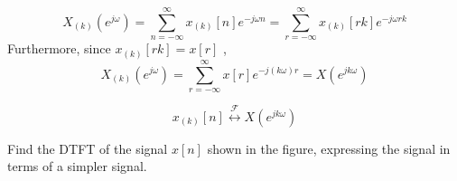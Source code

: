 \begin{frame}
        \begin{figure}
            \centering
            
        \end{figure}
\end{frame}

\begin{frame}
    \begin{equation*}
        X_{(k)}(e^{j\omega}) = \sum_{n=-\infty}^{\infty}x_{(k)}[n]e^{-j\omega n} = \sum_{r=-\infty}^{\infty}x_{(k)}[rk]e^{-j\omega rk}
    \end{equation*}
    Furthermore, since $x_{(k)}[rk] = x[r]$ ,
    \begin{equation*}
        X_{(k)}(e^{j\omega}) = \sum_{r=-\infty}^{\infty}x[r]e^{-j(k\omega) r} = X(e^{jk\omega})
    \end{equation*}

    \begin{equation*}
        x_{(k)}[n]  \overset{\mathcal{F}}{\leftrightarrow}  X(e^{jk\omega})
    \end{equation*}
\end{frame}


\begin{frame}
  {
        \begin{figure}
            \centering
            
        \end{figure}
  }
\end{frame}


\begin{frame}
    \begin{example}
        Find the DTFT of the signal $x[n]$ shown in the figure, expressing the signal in terms of a simpler signal.
    \end{example}
    \begin{figure}
        \centering
        
    \end{figure}
\end{frame}

\begin{frame}
    \begin{figure}
        \centering
        
    \end{figure}
\end{frame}

